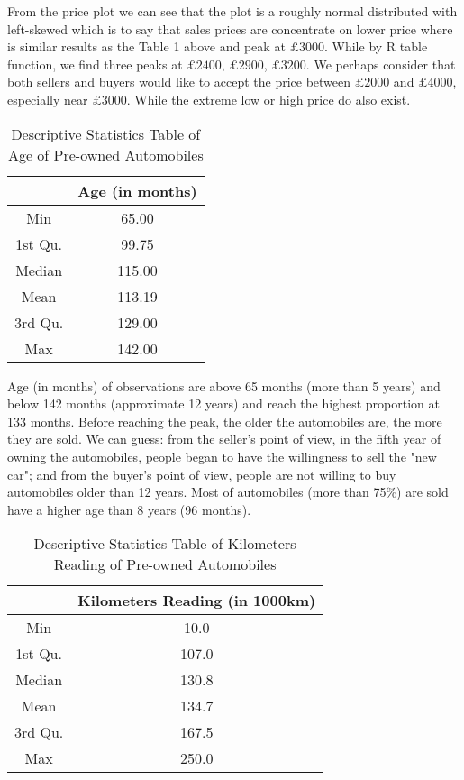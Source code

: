 \documentclass[a4paper]{article}
\begin{document}
\noindent 
From the price plot we can see that the plot is a roughly normal distributed with left-skewed which is to say that sales prices are concentrate on lower price where is similar results as the Table 1 above and peak at $\pounds3000$. While by R table function, we find three peaks at $\pounds2400$, $\pounds2900$, $\pounds3200$. We perhaps consider that both sellers and buyers would like to accept the price between $\pounds2000$ and $\pounds4000$, especially near $\pounds3000$. While the extreme low or high price do also exist.\\
\begin{table}[!htb]
    \centering
    \begin{tabular}{cc}
    \toprule
         &  Age (in months) \\
    \midrule
        Min  &  65.00 \\ 
         1st Qu.  &  99.75 \\ 
          Median  &  115.00 \\ 
           Mean  &  113.19 \\ 
            3rd Qu.  &  129.00 \\ 
             Max  &  142.00 \\ 
    \bottomrule
    \end{tabular}
    \caption{Descriptive Statistics Table of Age of Pre-owned Automobiles}
    \label{tab:my_label}
\end{table}

\noindent
Age (in months) of observations are above 65 months (more than 5 years) and below 142 months (approximate 12 years) and reach the highest proportion at 133 months. Before reaching the peak, the older the automobiles are, the more they are sold. We can guess: from the seller's point of view, in the fifth year of owning the automobiles, people began to have the willingness to sell the "new car"; and from the buyer's point of view, people are not willing to buy automobiles older than 12 years. Most of automobiles (more than 75\%) are sold have a higher age than 8 years (96 months). \\

\begin{table}[!htb]
    \centering
    \begin{tabular}{cc}
    \toprule
         &  Kilometers Reading (in 1000km) \\
    \midrule
        Min  &  10.0 \\ 
         1st Qu.  &  107.0 \\ 
          Median  &  130.8 \\ 
           Mean  &  134.7 \\ 
            3rd Qu.  &  167.5 \\ 
             Max  &  250.0 \\ 
    \bottomrule
    \end{tabular}
    \caption{Descriptive Statistics Table of Kilometers Reading of Pre-owned Automobiles}
    \label{tab:my_label}
\end{table}
\end{document}
